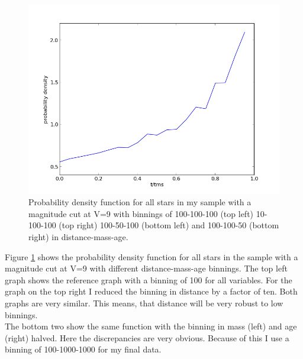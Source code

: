 \documentclass[a4paper,10pt]{article}
\begin{document}
\begin{figure}[h!]
\begin{minipage}{0.49\textwidth}
  \end{minipage}
  \begin{minipage}{0.49\textwidth}
   \includegraphics[width=\textwidth]{100-100-50}
  \end{minipage}
   \caption{Probability density function for all stars in my sample with a magnitude cut at V=9 with binnings of 100-100-100 (top left) 
   10-100-100 (top right) 100-50-100 (bottom left) and 100-100-50 (bottom right) in distance-mass-age.\label{binnings}}   
 \end{figure}
 
  Figure \ref{binnings} shows the probability density function for all stars in the sample
  with a magnitude cut at V=9 with different distance-mass-age binnings. The top left graph shows the reference graph
  with a binning of 100 for all variables. For the graph on the top right I reduced the binning in distance by a factor of ten. Both graphs
  are very similar. This means, that distance will be very robust to low binnings. \\
  The bottom two show the same function with the binning in mass (left) and age (right) halved. Here the discrepancies are very obvious. 
  Because of this I use a binning of 100-1000-1000 for my final data.
 
 \newpage
\end{document}
